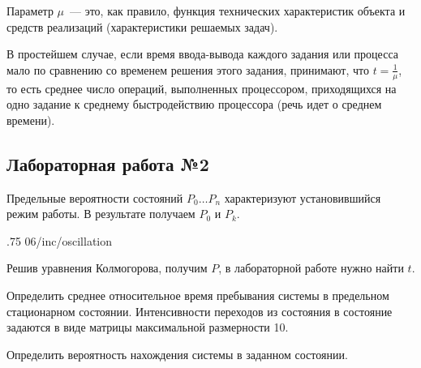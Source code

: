 Параметр $\mu$~--- это, как правило, функция технических характеристик объекта и средств реализаций (характеристики решаемых задач).

В простейшем случае, если время ввода-вывода каждого задания или процесса мало по сравнению со временем решения этого задания, принимают, что ${t = \frac{1}{\mu}}$, то есть среднее число операций, выполненных процессором, приходящихся на одно задание к среднему быстродействию процессора (речь идет о среднем времени).

\subsection{Лабораторная работа №2}

Предельные вероятности состояний $P_0\dots P_n$ характеризуют установившийся режим работы. В результате получаем $P_0$ и $P_k$.

\image
{.75\textwidth}
{06/inc/oscillation}
{}

Решив уравнения Колмогорова, получим $P$, в лабораторной работе нужно найти $t$.

Определить среднее относительное время пребывания системы в предельном стационарном состоянии. Интенсивности переходов из состояния в состояние задаются в виде матрицы максимальной размерности 10.

Определить вероятность нахождения системы в заданном состоянии.